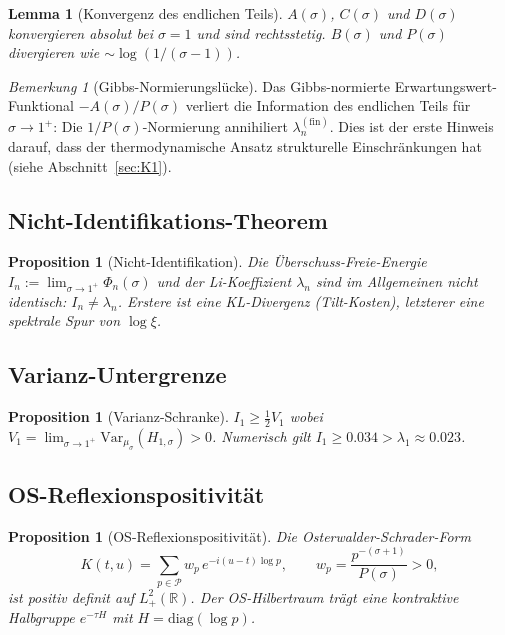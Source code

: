 \documentclass[12pt,a4paper]{article}
\newtheorem{lemma}[theorem]{Lemma}
\newtheorem{proposition}[theorem]{Proposition}
\theoremstyle{definition}
\theoremstyle{remark}
\newtheorem{remark}[theorem]{Bemerkung}
\newcommand{\muG}{\mu_\sigma}
\newcommand{\PP}{\mathcal{P}}
\begin{document}
\begin{lemma}[Konvergenz des endlichen Teils]
\label{lem:convergence}
$A(\sigma)$, $C(\sigma)$ und $D(\sigma)$ konvergieren absolut bei $\sigma = 1$ und sind rechtsstetig. $B(\sigma)$ und $P(\sigma)$ divergieren wie $\sim\log(1/(\sigma-1))$.
\end{lemma}

\begin{remark}[Gibbs-Normierungslücke]
Das Gibbs-normierte Erwartungswert-Funktional $-A(\sigma)/P(\sigma)$ verliert die Information des endlichen Teils für $\sigma \to 1^+$: Die $1/P(\sigma)$-Normierung annihiliert $\lambda_n^{(\mathrm{fin})}$. Dies ist der erste Hinweis darauf, dass der thermodynamische Ansatz strukturelle Einschränkungen hat (siehe Abschnitt~\ref{sec:K1}).
\end{remark}

\subsection{Nicht-Identifikations-Theorem}

\begin{proposition}[Nicht-Identifikation]
\label{prop:non-ident}
Die Überschuss-Freie-Energie $I_n := \lim_{\sigma \to 1^+}\Phi_n(\sigma)$ und der Li-Koeffizient $\lambda_n$ sind im Allgemeinen \emph{nicht} identisch: $I_n \neq \lambda_n$. Erstere ist eine KL-Divergenz (Tilt-Kosten), letzterer eine spektrale Spur von $\log\xi$.
\end{proposition}

\subsection{Varianz-Untergrenze}

\begin{proposition}[Varianz-Schranke]
\label{prop:variance}
$I_1 \geq \frac{1}{2}V_1$ wobei $V_1 = \lim_{\sigma \to 1^+}\mathrm{Var}_{\muG}(H_{1,\sigma}) > 0$. Numerisch gilt $I_1 \geq 0.034 > \lambda_1 \approx 0.023$.
\end{proposition}

\subsection{OS-Reflexionspositivität}

\begin{proposition}[OS-Reflexionspositivität]
\label{prop:os}
Die Osterwalder-Schrader-Form
\[
K(t,u) = \sum_{p \in \PP} w_p\,e^{-i(u-t)\log p}, \qquad w_p = \frac{p^{-(\sigma+1)}}{P(\sigma)} > 0,
\]
ist positiv definit auf $L^2_+(\mathbb{R})$. Der OS-Hilbertraum trägt eine kontraktive Halbgruppe $e^{-\tau H}$ mit $H = \mathrm{diag}(\log p)$.
\end{proposition}
\end{document}
